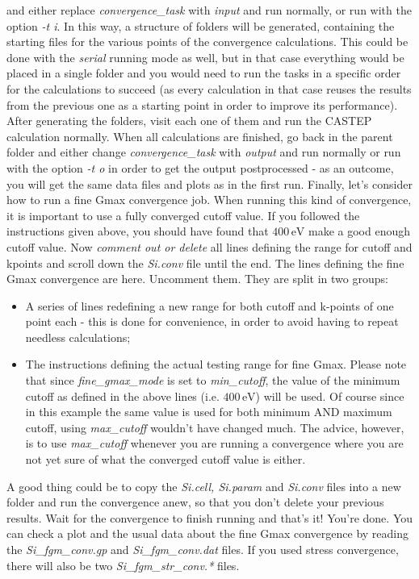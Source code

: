 \documentclass[10pt]{article}
\begin{document}
and either replace \textit{convergence\_task} with \textit{input} and run normally, or run with the option \textit{-t i}. In this way, a structure of folders will be generated, containing the starting files for the various points of the convergence calculations. This could be done with the \textit{serial} running mode as well, but in that case everything would be placed in a single folder and you would need to run the tasks in a specific order for the calculations to succeed (as every calculation in that case reuses the results from the previous one as a starting point in order to improve its performance). After generating the folders, visit each one of them and run the CASTEP calculation normally. When all calculations are finished, go back in the parent folder and either change \textit{convergence\_task} with \textit{output} and run normally or run with the option \textit{-t o} in order to get the output postprocessed - as an outcome, you will get the same data files and plots as in the first run.\newline
Finally, let's consider how to run a fine Gmax convergence job. When running this kind of convergence, it is important to use a fully converged cutoff value. If you followed the instructions given above, you should have found that $400\,\mathrm{eV}$ make a good enough cutoff value. Now \textit{comment out or delete} all lines defining the range for cutoff and kpoints and scroll down the \textit{Si.conv} file until the end. The lines defining the fine Gmax convergence are here. Uncomment them. They are split in two groups:

\begin{itemize}
 \item A series of lines redefining a new range for both cutoff and k-points of one point each - this is done for convenience, in order to avoid having to repeat needless calculations;
 \item The instructions defining the actual testing range for fine Gmax. Please note that since \textit{fine\_gmax\_mode} is set to \textit{min\_cutoff}, the value of the minimum cutoff as defined in the above lines (i.e. $400\,\mathrm{eV}$) will be used. Of course since in this example the same value is used for both minimum AND maximum cutoff, using \textit{max\_cutoff} wouldn't have changed much. The advice, however, is to use \textit{max\_cutoff} whenever you are running a convergence where you are not yet sure of what the converged cutoff value is either.
\end{itemize}

A good thing could be to copy the \textit{Si.cell, Si.param} and \textit{Si.conv} files into a new folder and run the convergence anew, so that you don't delete your previous results. Wait for the convergence to finish running and that's it! You're done. You can check a plot and the usual data about the fine Gmax convergence by reading the \textit{Si\_fgm\_conv.gp} and \textit{Si\_fgm\_conv.dat} files. If you used stress convergence, there will also be two \textit{Si\_fgm\_str\_conv.*} files.
\end{document}
